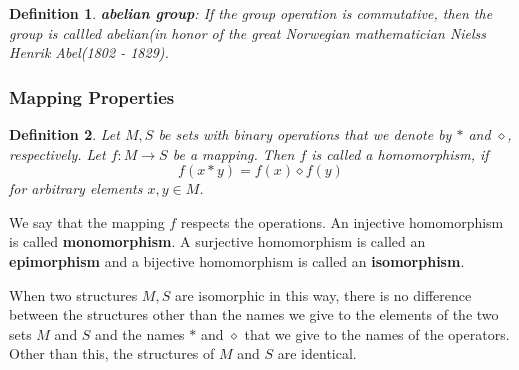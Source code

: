 \documentclass[a4paper]{article}
\newtheorem{definition}{Definition}[section]
\begin{document}
	\begin{definition}
		\textbf{abelian group}: If the group operation is commutative, then
		the group is callled abelian(in honor of the great Norwegian
		mathematician Nielss Henrik Abel(1802 - 1829).\cite{dixon2011algebra}
	\end{definition}

	\subsubsection{Mapping Properties}

	\begin{definition}
		Let $M, S$ be sets with binary operations that we denote by $\ast$ and
		$\diamond$, respectively. Let $ f:M \rightarrow S $ be a mapping. Then
		$f$ is called a homomorphism, if 
		\begin{displaymath}
			f(x\ast y) = f(x) \diamond f(y)
		\end{displaymath}
		for arbitrary elements $x,y \in M$.\cite{dixon2011algebra}
	\end{definition}

	We say that the mapping $f$ respects the operations. An injective
	homomorphism is called \textbf{monomorphism}. A surjective homomorphism is called
	an \textbf{epimorphism} and a bijective homomorphism is called an
	\textbf{isomorphism}.\cite{dixon2011algebra}

	When two structures $M,S$ are isomorphic in this way, there is no
	difference between the structures other than the names we give to the
	elements of the two sets $M$ and $S$ and the names $\ast$ and $\diamond$
	that we give to the names of the operators. Other than this, the
	structures of $M$ and $S$ are identical.\cite{dixon2011algebra}
\end{document}
